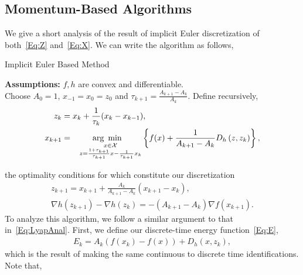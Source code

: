\documentclass[11pt]{article}
\theoremstyle{plain}
\newcommand{\X}{{\mathcal X}}
\begin{document}
   \subsection{Momentum-Based Algorithms}
 We give a short analysis of the result of implicit Euler discretization of both~\eqref{Eq:Z} and~\eqref{Eq:X}. We can write the algorithm as follows,
\begin{algorithm}[H]
\caption{Implicit Euler Based Method}
{\bf Assumptions:} $f, h$ are convex and differentiable.\\
Choose $A_0 = 1$, $x_{-1}= x_0 = z_0$ and $\tau_{k+1} = \frac{A_{k+1} - A_k}{A_k}$. Define recursively,
\begin{subequations}\label{Eq:AlgoForward1}
\begin{align}
z_{k} &= x_{k} + \frac{1}{\tau_{k}} (x_{k} - x_{k-1}),\\%
x_{k+1} &= \underset{\substack{\,\,\,\,\,\,x\in\X\\ \,\,\,\,\,\,z =  \frac{1 + \tau_{k+1}}{\tau_{k+1}} x - \frac{1}{\tau_{k+1}} x_k}}{\text{arg\,\,\,min}} \left\{ f(x) + \frac{1}{A_{k+1} - A_k}D_h\left(z, z_k\right)\right\},
\end{align}
\end{subequations}
\end{algorithm}
\noindent the optimality conditions for which constitute our discretization
\begin{subequations}
\begin{align}
z_{k+1} = x_{k+1} + \frac{A_k}{A_{k+1} -A_{k}} (x_{k+1} - x_k),\label{Eq:ZSeq}\\
\nabla h(z_{k+1}) - \nabla h(z_k) = -(A_{k+1} - A_{k})\nabla f(x_{k+1})\label{Eq:XSeq}.
\end{align}
\end{subequations}
\noindent To analyze this algorithm, we follow a similar argument to that in~\eqref{Eq:LyapAnal}. %
First, we define our discrete-time energy function~\eqref{Eq:E},
\begin{align}\label{Eq:DiscLyapFunc1}
 E_k = A_k(f(x_k) - f(x)) + D_h(x, z_{k}),
 \end{align}
which is the result of making the same continuous to discrete time identifications. Note that,
\end{document}
